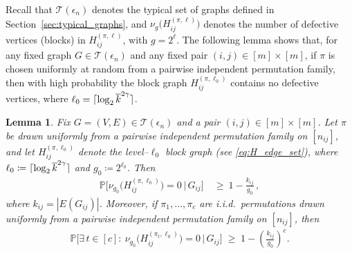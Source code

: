 \documentclass[journal]{IEEEtran}
\newtheorem{lemma}{Lemma}
\theoremstyle{definition}
\theoremstyle{definition}
\newcommand{\Tc}{\mathcal{T}}
\newcommand{\PP}{\mathbb{P}}
\newcommand{\PV}{\nu}
\newcommand{\kb}{\overline{k}}
\DeclarePairedDelimiter\ceil{\lceil}{\rceil}
\begin{document}

Recall that $\Tc(\epsilon_n)$ denotes the typical set of graphs defined in Section~\ref{sec:typical_graphs}, and $\PV_g\big(H_{ij}^{(\pi,\ell)}\big)$ denotes the number of defective vertices (blocks) in $H_{ij}^{(\pi,\ell)}$, with $g = 2^{\ell}$. The following lemma shows that, for any fixed graph $G \in \Tc(\epsilon_n)$ and any fixed pair $(i,j) \in [m]\times[m]$, if \(\pi\) is chosen uniformly at random from a pairwise independent permutation family, then with high probability the block graph $H_{ij}^{(\pi,\ell_0)}$ contains no defective vertices, where $\ell_0 = \ceil{\log_2 \kb^{2\gamma}}$.  

\begin{lemma}\label{lem:empty-level}
Fix $G = (V,E)\in \Tc(\epsilon_n)$ and a pair \((i,j) \in [m] \times [m]\). 
Let \(\pi\) be drawn uniformly from a pairwise independent permutation family on \([n_{ij}]\), and let \(H_{ij}^{(\pi, \ell_0)}\) denote the level–\(\ell_0\) block graph (see \eqref{eq:H_edge_set}), where \(\ell_0 \coloneqq \ceil{\log_2 \kb^{2\gamma}}\) and \(g_0\coloneqq 2^{\ell_0}\). Then
\begin{align*}
  \PP\Big[\PV_{g_0}\big(H_{ij}^{(\pi, \ell_0)}\big)=0 \,\Big|\, G_{ij}\Big] 
  &\ \ge\ 1 - \frac{k_{ij}}{g_0} \, ,
\end{align*}
where $k_{ij} = |E(G_{ij})|$.
Moreover, if \(\pi_1,\ldots,\pi_c\) are i.i.d.~permutations drawn uniformly from a pairwise independent permutation family on \( [n_{ij}]\), then
\begin{align*}
  \PP\Big[\exists\, t \in [c]:\ \PV_{g_0} \big(H_{ij}^{(\pi_t,\ell_0)}\big)=0 
  \,\Big|\, G_{ij}\Big] 
  \;\ge\; 1 - \left(\tfrac{k_{ij}}{g_0}\right)^{c}.
\end{align*}
\end{lemma}
\end{document}
